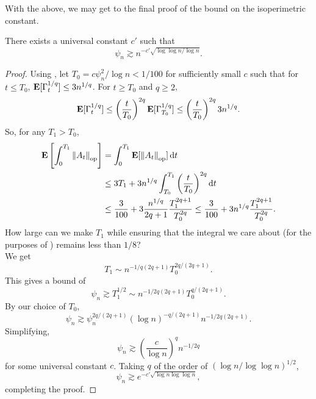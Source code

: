 		With the above, we may get to the final proof of the bound on the isoperimetric constant.

		\begin{ftheo}
			There exists a universal constant $c'$ such that
			\[ \psi_n \gtrsim n^{-c'\sqrt{\log \log n / \log n}}. \]
		\end{ftheo}
		\begin{proof}
			Using  , let $T_0 = c \psi_n^2 / \log n < 1 / 100$ for sufficiently small $c$ such that for $t\leq T_0$, $\textbf{E}[\Gamma_t^{1/q}] \leq 3n^{1/q}$. For $t \geq T_0$ and $q \geq 2$,
			\[ \textbf{E}[\Gamma_t^{1/q}] \leq \left(\frac{t}{T_0}\right)^{2q} \textbf{E}[\Gamma_{T_0}^{1/q}] \leq \left(\frac{t}{T_0}\right)^{2q} 3n^{1/q}. \]
			So, for any $T_1 > T_0$,
			\begin{align*}
				\textbf{E}\left[ \int_0^{T_1} \left\lVert A_t\right\rVert_{\text{op}} \right] &= \int_0^{T_1} \textbf{E}[\left\lVert A_t\right\rVert_{\text{op}}] \operatorname{d}\!{t} \\
					&\leq 3T_1 + 3n^{1/q} \int_{T_0}^{T_1} \left(\frac{t}{T_0}\right)^{2q} \operatorname{d}\!{t} \\
					&\leq \frac{3}{100} + 3 \frac{ n^{1/q} }{2q+1} \frac{T_1^{2q+1}}{T_0^{2q}} \leq \frac{3}{100} + 3 n^{1/q} \frac{T_1^{2q+1}}{T_0^{2q}}.
			\end{align*}
			How large can we make $T_1$ while ensuring that the integral we care about (for the purposes of ) remains less than $1/8$?\\
			We get
			\[ T_1 \sim n^{-1/q(2q+1)} T_0^{2q/(2q+1)}. \]
			This gives a bound of
			\[ \psi_n \gtrsim T_1^{1/2} \sim n^{-1/2q(2q+1)} T_0^{q/(2q+1)}. \]
			By our choice of $T_0$,
			\[ \psi_n \gtrsim \psi_n^{2q/(2q+1)} (\log n)^{-q/(2q+1)} n^{-1/2q(2q+1)}. \]
			Simplifying,
			\[ \psi_n \gtrsim \left(\frac{c}{\log n}\right)^{q} n^{-1/2q} \]
			for some universal constant $c$. Taking $q$ of the order of $\left(\log n / \log \log n\right)^{1/2}$,
			\[ \psi_n \gtrsim e^{-c' \sqrt{\log n \log \log n} }, \]
			completing the proof.
		\end{proof}



